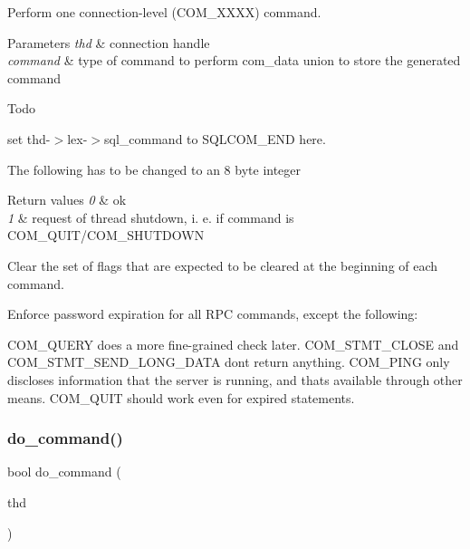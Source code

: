 Perform one connection-\/level (C\+O\+M\+\_\+\+X\+X\+XX) command.


\begin{DoxyParams}{Parameters}
{\em thd} & connection handle \\
\hline
{\em command} & type of command to perform  com\+\_\+data union to store the generated command\\
\hline
\end{DoxyParams}
\begin{DoxyRefDesc}{Todo}
\item[\mbox{\hyperlink{todo__todo000100}{Todo}}]set thd-\/$>$lex-\/$>$sql\+\_\+command to S\+Q\+L\+C\+O\+M\+\_\+\+E\+ND here. 

The following has to be changed to an 8 byte integer\end{DoxyRefDesc}



\begin{DoxyRetVals}{Return values}
{\em 0} & ok \\
\hline
{\em 1} & request of thread shutdown, i. e. if command is C\+O\+M\+\_\+\+Q\+U\+I\+T/\+C\+O\+M\+\_\+\+S\+H\+U\+T\+D\+O\+WN \\
\hline
\end{DoxyRetVals}
Clear the set of flags that are expected to be cleared at the beginning of each command.

Enforce password expiration for all R\+PC commands, except the following\+:

C\+O\+M\+\_\+\+Q\+U\+E\+RY does a more fine-\/grained check later. C\+O\+M\+\_\+\+S\+T\+M\+T\+\_\+\+C\+L\+O\+SE and C\+O\+M\+\_\+\+S\+T\+M\+T\+\_\+\+S\+E\+N\+D\+\_\+\+L\+O\+N\+G\+\_\+\+D\+A\+TA don\textquotesingle{}t return anything. C\+O\+M\+\_\+\+P\+I\+NG only discloses information that the server is running, and that\textquotesingle{}s available through other means. C\+O\+M\+\_\+\+Q\+U\+IT should work even for expired statements.\mbox{\label{group__Runtime__Environment_ga331df424a7892fbbad536f0f3a7b18f6}} 
\subsubsection{\texorpdfstring{do\+\_\+command()}{do\_command()}}
{\footnotesize\ttfamily bool do\+\_\+command (\begin{DoxyParamCaption}\item[{T\+HD $\ast$}]{thd }\end{DoxyParamCaption})}

